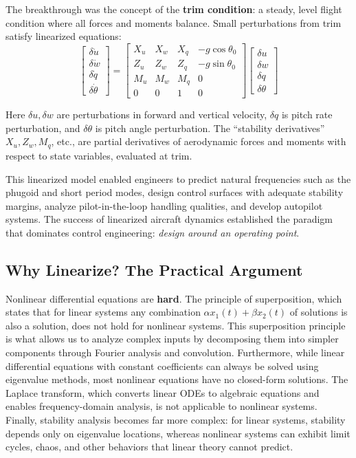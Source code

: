 The breakthrough was the concept of the \textbf{trim condition}: a steady, level flight condition where all forces and moments balance. Small perturbations from trim satisfy linearized equations:
\begin{equation}
\begin{bmatrix} \delta\dot{u} \\ \delta\dot{w} \\ \delta\dot{q} \\ \delta\dot{\theta} \end{bmatrix} =
\begin{bmatrix} X_u & X_w & X_q & -g\cos\theta_0 \\
Z_u & Z_w & Z_q & -g\sin\theta_0 \\
M_u & M_w & M_q & 0 \\
0 & 0 & 1 & 0 \end{bmatrix}
\begin{bmatrix} \delta u \\ \delta w \\ \delta q \\ \delta\theta \end{bmatrix}
\end{equation}

Here $\delta u, \delta w$ are perturbations in forward and vertical velocity, $\delta q$ is pitch rate perturbation, and $\delta\theta$ is pitch angle perturbation. The ``stability derivatives'' $X_u, Z_w, M_q$, etc., are partial derivatives of aerodynamic forces and moments with respect to state variables, evaluated at trim.

This linearized model enabled engineers to predict natural frequencies such as the phugoid and short period modes, design control surfaces with adequate stability margins, analyze pilot-in-the-loop handling qualities, and develop autopilot systems. The success of linearized aircraft dynamics established the paradigm that dominates control engineering: \textit{design around an operating point}.

\subsection{Why Linearize? The Practical Argument}

Nonlinear differential equations are \textbf{hard}. The principle of superposition, which states that for linear systems any combination $\alpha x_1(t) + \beta x_2(t)$ of solutions is also a solution, does not hold for nonlinear systems. This superposition principle is what allows us to analyze complex inputs by decomposing them into simpler components through Fourier analysis and convolution. Furthermore, while linear differential equations with constant coefficients can always be solved using eigenvalue methods, most nonlinear equations have no closed-form solutions. The Laplace transform, which converts linear ODEs to algebraic equations and enables frequency-domain analysis, is not applicable to nonlinear systems. Finally, stability analysis becomes far more complex: for linear systems, stability depends only on eigenvalue locations, whereas nonlinear systems can exhibit limit cycles, chaos, and other behaviors that linear theory cannot predict.

